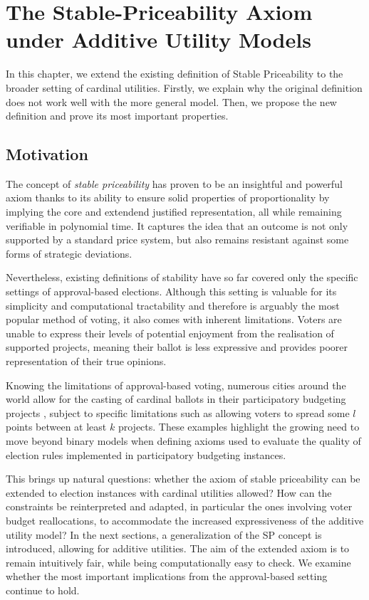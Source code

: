 \chapter{The Stable-Priceability Axiom under Additive Utility Models}\label{chap:2}
In this chapter, we extend the existing definition of Stable Priceability to the broader setting of cardinal utilities. Firstly, we explain why the original definition does not work well with the more general model. Then, we propose the new definition and prove its most important properties.
\section{Motivation}
The concept of \emph{stable priceability} has proven to be an insightful and powerful axiom thanks to its ability to ensure solid properties of proportionality by implying the core and extendend justified representation, all while remaining verifiable in polynomial time. It captures the idea that an outcome is not only supported by a standard price system, but also remains resistant against some forms of strategic deviations.

Nevertheless, existing definitions of stability have so far covered only the specific settings of approval-based elections. Although this setting is valuable for its simplicity and computational tractability and therefore is arguably the most popular method of voting, it also comes with inherent limitations. Voters are unable to express their levels of potential enjoyment from the realisation of supported projects, meaning their ballot is less expressive and provides poorer representation of their true opinions. 

Knowing the limitations of approval-based voting, numerous cities around the world allow for the casting of cardinal ballots in their participatory budgeting projects \cite{StrasbourgBallots, ToulouseBallots, GdanskBallots, PBElicitation}, subject to specific limitations such as allowing voters to spread some $l$ points between at least $k$ projects. These examples highlight the growing need to move beyond binary models when defining axioms used to evaluate the quality of election rules implemented in participatory budgeting instances.

This brings up natural questions: whether the axiom of stable priceability can be extended to election instances with cardinal utilities allowed? How can the constraints be reinterpreted and adapted, in particular the ones involving voter budget reallocations, to accommodate the increased expressiveness of the additive utility model? In the next sections, a generalization of the SP concept is introduced, allowing for additive utilities. The aim of the extended axiom is to remain intuitively fair, while being computationally easy to check. We examine whether the most important implications from the approval-based setting continue to hold.

